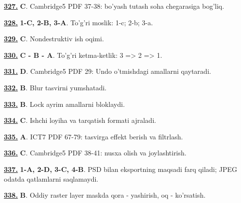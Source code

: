 \documentclass[10pt,a4paper,oneside]{article}
\begin{document}
\noindent\hyperlink{q327}{\textbf{327.}} \textbf{C}.  Cambridge5 PDF 37-38: bo'yash tutash soha chegarasiga bog'liq.
\par\vspace{3mm}
\noindent\hyperlink{q328}{\textbf{328.}} \textbf{1-C, 2-B, 3-A}.  To'g'ri moslik: 1-c; 2-b; 3-a.
\par\vspace{3mm}
\noindent\hyperlink{q329}{\textbf{329.}} \textbf{C}.  Nondestruktiv ish oqimi.
\par\vspace{3mm}
\noindent\hyperlink{q330}{\textbf{330.}} \textbf{C - B - A}.  To'g'ri ketma-ketlik: 3 =\textgreater{} 2 =\textgreater{} 1.
\par\vspace{3mm}
\noindent\hyperlink{q331}{\textbf{331.}} \textbf{D}.  Cambridge5 PDF 29: Undo o'tmishdagi amallarni qaytaradi.
\par\vspace{3mm}
\noindent\hyperlink{q332}{\textbf{332.}} \textbf{B}.  Blur tasvirni yumshatadi.
\par\vspace{3mm}
\noindent\hyperlink{q333}{\textbf{333.}} \textbf{B}.  Lock ayrim amallarni bloklaydi.
\par\vspace{3mm}
\noindent\hyperlink{q334}{\textbf{334.}} \textbf{C}.  Ishchi loyiha va tarqatish formati ajraladi.
\par\vspace{3mm}
\noindent\hyperlink{q335}{\textbf{335.}} \textbf{A}.  ICT7 PDF 67-79: tasvirga effekt berish va filtrlash.
\par\vspace{3mm}
\noindent\hyperlink{q336}{\textbf{336.}} \textbf{C}.  Cambridge5 PDF 38-41: nusxa olish va joylashtirish.
\par\vspace{3mm}
\noindent\hyperlink{q337}{\textbf{337.}} \textbf{1-A, 2-D, 3-C, 4-B}.  PSD bilan eksportning maqsadi farq qiladi; JPEG odatda qatlamlarni saqlamaydi.
\par\vspace{3mm}
\noindent\hyperlink{q338}{\textbf{338.}} \textbf{B}.  Oddiy raster layer maskda qora - yashirish, oq - ko'rsatish.
\end{document}
